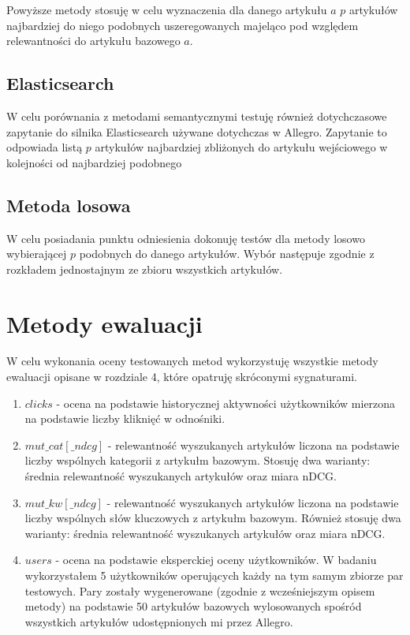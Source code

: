\documentclass[pl]{minipw} %
\begin{document}
Powyższe metody stosuję w celu wyznaczenia dla danego artykułu $a$ $p$ artykułów najbardziej do niego podobnych uszeregowanych majeląco pod względem relewantności do artykułu bazowego $a$.

\subsection{Elasticsearch}
W celu porównania z metodami semantycznymi testuję również dotychczasowe zapytanie do silnika Elasticsearch używane dotychczas w Allegro. Zapytanie to odpowiada listą $p$ artykułów najbardziej zbliżonych do artykułu wejściowego w kolejności od najbardziej podobnego

\subsection{Metoda losowa}
W celu posiadania punktu odniesienia dokonuję testów dla metody losowo wybierającej $p$ podobnych do danego artykułów. Wybór następuje zgodnie z rozkładem jednostajnym ze zbioru wszystkich artykułów.

\section{Metody ewaluacji}

W celu wykonania oceny testowanych metod wykorzystuję wszystkie metody ewaluacji opisane w rozdziale 4, które opatruję skróconymi sygnaturami.
\begin{enumerate}
	\item $clicks$ - ocena na podstawie historycznej aktywności użytkowników mierzona na podstawie liczby kliknięć w odnośniki.
	\item $mut\_cat[\_ndcg]$ - relewantność wyszukanych artykułów liczona na podstawie liczby wspólnych kategorii z artykułm bazowym. Stosuję dwa warianty: średnia relewantność wyszukanych artykułów oraz miara nDCG.
	\item $mut\_kw[\_ndcg]$ - relewantność wyszukanych artykułów liczona na podstawie liczby wspólnych słów kluczowych z artykułm bazowym. Również stosuję dwa warianty: średnia relewantność wyszukanych artykułów oraz miara nDCG.
	\item $users$ - ocena na podstawie eksperckiej oceny użytkowników. W badaniu wykorzystałem 5 użytkowników operujących każdy na tym samym zbiorze par testowych. Pary zostały wygenerowane (zgodnie z wcześniejszym opisem metody) na podstawie 50 artykułów bazowych wylosowanych spośród wszystkich artykułów udostępnionych mi przez Allegro.
\end{enumerate}
\end{document}
